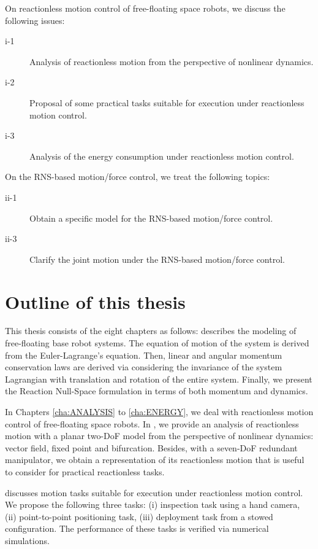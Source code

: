 On reactionless motion control of free-floating space robots,
we discuss the following issues:
%
\begin{description}
\item[i-1] Analysis of reactionless motion from the perspective of nonlinear dynamics.
\item[i-2] Proposal of some practical tasks suitable for execution under reactionless motion control.
\item[i-3] Analysis of the energy consumption under reactionless motion control.
\end{description}
%

On the RNS-based motion/force control,
we treat the following topics:
\begin{description}
\item[ii-1] Obtain a specific model for the RNS-based motion/force control.
\item[ii-3] Clarify the joint motion under the RNS-based motion/force control.
\end{description}


\section{Outline of this thesis}
This thesis consists of the eight chapters as follows:
 describes the modeling of free-floating base robot systems.
The equation of motion of the system is derived from the Euler-Lagrange's equation.
Then, linear and angular momentum conservation laws are
derived via considering the invariance of the system Lagrangian 
with translation and rotation of the entire system.
Finally, we present the Reaction Null-Space formulation
in terms of both momentum and dynamics.

In Chapters \ref{cha:ANALYSIS} to \ref{cha:ENERGY},
we deal with reactionless motion control of free-floating space robots.
In ,
we provide an analysis of reactionless motion with a planar two-DoF model
from the perspective of nonlinear dynamics:
vector field, fixed point and bifurcation.
Besides, with a seven-DoF redundant manipulator,
we obtain a representation of its reactionless motion that is useful to consider
for practical reactionless tasks.

 discusses motion tasks suitable for execution
under reactionless motion control.
We propose the following three tasks:
(i) inspection task using a hand camera,
(ii) point-to-point positioning task,
(iii) deployment task from a stowed configuration.
The performance of these tasks is verified via numerical simulations.

